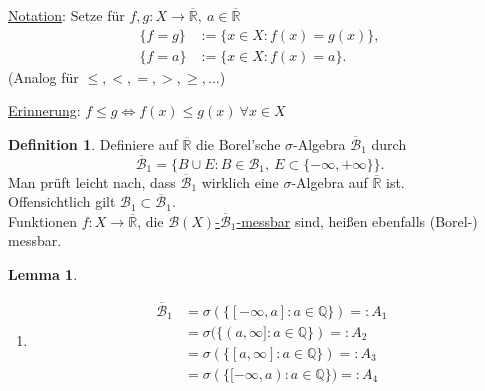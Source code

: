 \documentclass[a4paper]{report}
\newcommand{\R}{\mathbb{R}}
\newcommand{\Rq}{\overline{\R}}
\newcommand{\Q}{\mathbb{Q}}
\newcommand{\Borel}{\mathcal{B}}
\newcommand{\Borelq}{\overline{\Borel}}
\newcommand{\jlabel}[1]{\label{j_#1}}
\newcommand{\jhyperref}[2]{\hyperref[j_#1]{#2}}
\newcommand{\mb}[2]{\jhyperref{messbar}{#1-#2-messbar}}
\newcommand{\jabb}[3]{ #1: #2 \rightarrow #3 }
\theoremstyle{plain}
\newtheorem{lem}[thm]{Lemma}
\theoremstyle{definition}
\newtheorem*{defn*}{Definition}
\begin{document}
{{{\uline{Notation}: Setze für $\jabb{f,g}{X}{\Rq}, \ a\in \Rq$ 
\begin{displaymath}
    \begin{split}
        \{f=g\} &:= \{x\in X: f(x) = g(x)\},\\
        \{f=a\} &:= \{x\in X: f(x) = a\}.
    \end{split} 
\end{displaymath}
(Analog für $\le, <, =, >, \ge, \dots$)

\vspace{12pt}

\uline{Erinnerung}: $f\le g \Leftrightarrow f(x) \le g(x) \ \forall x\in X$

\begin{defn*}
    Definiere auf $\Rq$ die Borel'sche $\sigma$-Algebra $\Borelq_1$ durch
    \jlabel{(2.1)}
    \begin{equation}
        \Borelq_1 = \{B\cup E : B\in \Borel_1, \ E\subset \{-\infty, +\infty\}\}.
    \end{equation}
    Man prüft leicht nach, dass $\Borelq_1$ wirklich eine $\sigma$-Algebra auf $\Rq$ ist.\\
    Offensichtlich gilt $\Borel_1 \subset \Borelq_1$.\\
    Funktionen $\jabb{f}{X}{\Rq}$, die \mb{$\Borel(X)$}{$\Borelq_1$} sind, heißen ebenfalls (Borel-) messbar.
\end{defn*}

\jlabel{Lem 2.6}
\begin{lem}
    \begin{enumerate}
        \item 
            \begin{displaymath}
                \begin{split}
                    \Borelq_1 &= \sigma(\{[-\infty, a]: a\in \Q\}) =: A_1\\
                                             &= \sigma(\{(a, \infty]: a\in \Q\}) =: A_2\\
                                             &= \sigma(\{[a, \infty]: a\in \Q\}) =: A_3\\
                                             &= \sigma(\{[-\infty, a): a\in \Q\}) =: A_4
                \end{split}
            \end{displaymath}
            

\end{enumerate}
\end{lem}}}}
\end{document}
